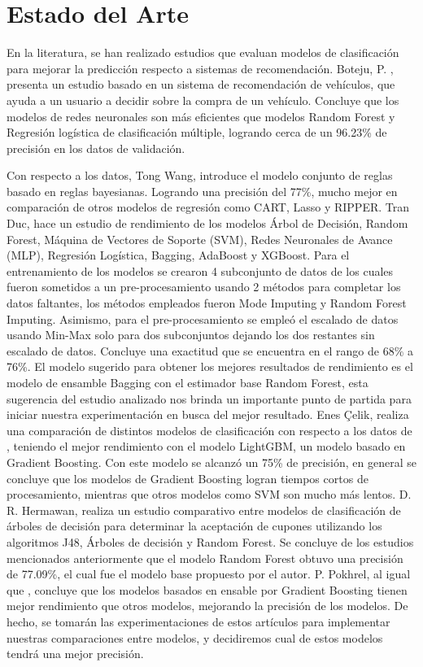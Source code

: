 \documentclass[conference]{IEEEtran}
\begin{document}
\section{Estado del Arte}

En la literatura, se han realizado estudios que evaluan modelos de clasificación para mejorar la predicción respecto a sistemas de recomendación. Boteju, P. \cite{b3}, presenta un estudio basado en un sistema de recomendación de vehículos, que ayuda a un usuario a decidir sobre la compra de un vehículo. Concluye que los modelos de redes neuronales son más eficientes que modelos Random Forest y Regresión logística de clasificación múltiple, logrando cerca de un 96.23\% de precisión en los datos de validación.

Con respecto a los datos, Tong Wang\cite{b2}, introduce el modelo conjunto de reglas basado en reglas bayesianas. Logrando una precisión del 77\%, mucho mejor en comparación de otros modelos de regresión como CART, Lasso y RIPPER. Tran Duc\cite{b4}, hace un estudio de rendimiento de los modelos Árbol de Decisión, Random Forest, Máquina de Vectores de Soporte (SVM), Redes Neuronales de Avance (MLP), Regresión Logística, Bagging, AdaBoost y XGBoost. Para el entrenamiento de los modelos se crearon 4 subconjunto de datos de los cuales fueron sometidos a un pre-procesamiento usando 2 métodos para completar los datos faltantes, los métodos empleados fueron Mode Imputing y Random Forest Imputing. Asimismo, para el pre-procesamiento se empleó el escalado de datos usando Min-Max solo para dos subconjuntos dejando los dos restantes sin escalado de datos. Concluye una exactitud que se encuentra en el rango de 68\% a 76\%. El modelo sugerido para obtener los mejores resultados de rendimiento es el modelo de ensamble Bagging con el estimador base Random Forest, esta sugerencia del estudio analizado nos brinda un importante punto de partida para iniciar nuestra experimentación en busca del mejor resultado. Enes Çelik\cite{b5}, realiza una comparación de distintos modelos de clasificación con respecto a los datos de \cite{b2}, teniendo el mejor rendimiento con el modelo LightGBM, un modelo basado en Gradient Boosting. Con este modelo se alcanzó un 75\% de precisión, en general se concluye que los modelos de Gradient Boosting logran tiempos cortos de procesamiento, mientras que otros modelos como SVM son mucho más lentos. D. R. Hermawan\cite{b6}, realiza un estudio comparativo entre modelos de clasificación de árboles de decisión para determinar la aceptación de cupones utilizando los algoritmos J48, Árboles de decisión y Random Forest. Se concluye de los estudios mencionados anteriormente que el modelo Random Forest obtuvo una precisión de 77.09\%, el cual fue el modelo base propuesto por el autor. P. Pokhrel\cite{b7}, al igual que \cite{b5}, concluye que los modelos basados en ensable por Gradient Boosting tienen mejor rendimiento que otros modelos, mejorando la precisión de los modelos. De hecho, se tomarán las experimentaciones de estos artículos para implementar nuestras comparaciones entre modelos, y decidiremos cual de estos modelos tendrá una mejor precisión.
\end{document}
